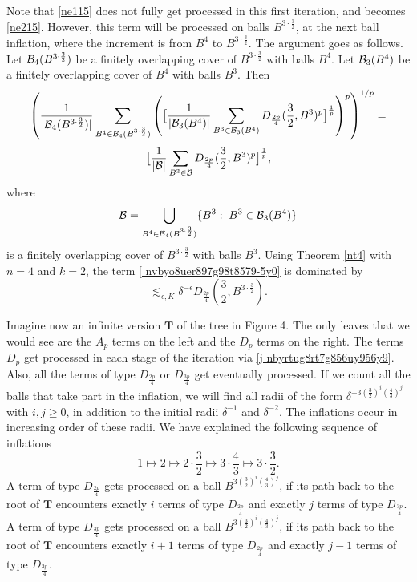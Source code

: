 \documentclass[amssymb,amsfonts,12pt]{amsart}
\begin{document}
Note that \eqref{ne115} does not fully get processed in this first iteration, and becomes \eqref{ne215}. However, this term will be processed on balls $B^{3\cdot \frac32}$, at the next ball inflation, where the increment is from $B^4$ to $B^{3\cdot \frac32}$. The argument goes as follows. Let ${\mathcal B}_4(B^{3\cdot \frac32})$ be a finitely overlapping cover of $B^{3\cdot \frac32}$ with balls $B^4$. Let ${\mathcal B}_3(B^4)$ be a finitely overlapping cover of $B^4$ with balls $B^3$. Then
$$\left(\frac{1}{|{\mathcal B}_4(B^{3\cdot \frac32})|}\sum_{B^4\in{\mathcal B}_4(B^{3\cdot \frac32})}\left(\big[\frac{1}{|{\mathcal B}_3(B^4)|}\sum_{B^3\in{\mathcal B}_3(B^4)}D_{\frac{2p}{4}}(\frac32,B^3)^p\big]^{\frac1{p}}\right)^p\right)^{1/p}=$$
\begin{equation}
\label{ nvbyo8uer897g98t8579-5y0}
\big[\frac{1}{|{\mathcal B}|}\sum_{B^3\in{\mathcal B}}D_{\frac{2p}{4}}(\frac32,B^3)^p\big]^{\frac1{p}},
\end{equation}
where $${\mathcal B}=\bigcup_{B^4\in {\mathcal B}_4(B^{3\cdot \frac32})}\{B^3:\;B^3\in{\mathcal B}_3(B^4)\}$$
is a finitely overlapping cover of $B^{3\cdot\frac32}$ with balls $B^3$. Using Theorem \ref{nt4} with $n=4$ and $k=2$, the term \eqref{ nvbyo8uer897g98t8579-5y0} is dominated by
$$\lesssim_{\epsilon,K}\delta^{-\epsilon}D_{\frac{2p}{4}}(\frac32,B^{3\cdot\frac32}).$$
\bigskip

Imagine now an infinite version $\textbf{T}$ of the tree in Figure 4. The only leaves that we would see are the $A_p$ terms on the left and the $D_p$ terms on the right. The terms $D_p$ get processed in each stage of the iteration via \eqref{j nbyrtug8rt7g856uy956y9}. Also, all the terms of type $D_{\frac{2p}{4}}$ or $D_{\frac{3p}{4}}$ get eventually processed.  If we count all the  balls that take part in the inflation, we will find all radii of the form $\delta^{-3(\frac32)^i(\frac43)^j}$ with $i,j\ge 0$, in addition to the initial radii $\delta^{-1}$ and $\delta^{-2}$. The inflations occur in increasing order of these radii. We have explained the following sequence of inflations
$$1\mapsto 2\mapsto 2\cdot\frac32\mapsto 3\cdot\frac43\mapsto 3\cdot\frac32.$$
A term of type $D_{\frac{2p}{4}}$ gets processed on a ball $B^{3(\frac32)^i(\frac43)^j}$, if its path back to the root of $\textbf{T}$ encounters exactly $i$ terms of type $D_{\frac{2p}{4}}$ and exactly $j$ terms of type $D_{\frac{3p}{4}}$. A term of type $D_{\frac{3p}{4}}$ gets processed on a ball $B^{3(\frac32)^i(\frac43)^j}$, if its path back to the root of $\textbf{T}$ encounters exactly $i+1$ terms of type $D_{\frac{2p}{4}}$ and exactly $j-1$ terms of type $D_{\frac{3p}{4}}$.
\end{document}
